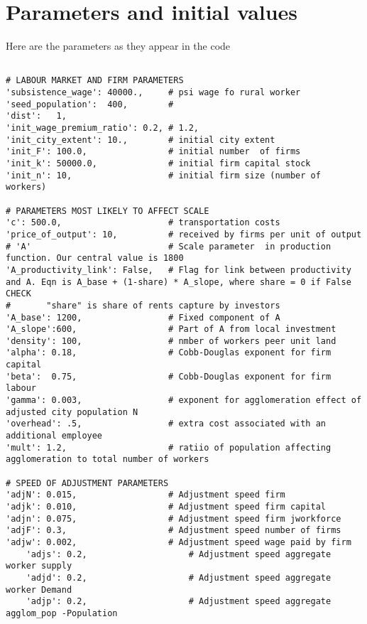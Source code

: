 \chapter{Parameters and initial values} \label{appendix-parameters}

Here are the parameters as they appear in the code 
{\tiny\begin{verbatim} 

# LABOUR MARKET AND FIRM PARAMETERS
'subsistence_wage': 40000.,     # psi wage fo rural worker
'seed_population':  400,        # 
'dist':   1, 
'init_wage_premium_ratio': 0.2, # 1.2,
'init_city_extent': 10.,        # initial city extent
'init_F': 100.0,                # initial number  of firms
'init_k': 50000.0,              # initial firm capital stock 
'init_n': 10,                   # initial firm size (number of workers)

# PARAMETERS MOST LIKELY TO AFFECT SCALE
'c': 500.0,                     # transportation costs
'price_of_output': 10,          # received by firms per unit of output
# 'A'                           # Scale parameter  in production function. Our central value is 1800
'A_productivity_link': False,   # Flag for link between productivity and A. Eqn is A_base + (1-share) * A_slope, where share = 0 if False CHECK
#       "share" is share of rents capture by investors 
'A_base': 1200,                 # Fixed component of A
'A_slope':600,                  # Part of A from local investment 
'density': 100,                 # nmber of workers peer unit land
'alpha': 0.18,                  # Cobb-Douglas exponent for firm capital
'beta':  0.75,                  # Cobb-Douglas exponent for firm labour
'gamma': 0.003,                 # exponent for agglomeration effect of adjusted city population N
'overhead': .5,                 # extra cost associated with an additional employee 
'mult': 1.2,                    # ratiio of population affecting agglomeration to total number of workers 

# SPEED OF ADJUSTMENT PARAMETERS 
'adjN': 0.015,                  # Adjustment speed firm
'adjk': 0.010,                  # Adjustment speed firm capital
'adjn': 0.075,                  # Adjustment speed firm jworkforce
'adjF': 0.3,                    # Adjustment speed number of firms
'adjw': 0.002,                  # Adjustment speed wage paid by firm
    'adjs': 0.2,                    # Adjustment speed aggregate worker supply 
    'adjd': 0.2,                    # Adjustment speed aggregate worker Demand 
    'adjp': 0.2,                    # Adjustment speed aggregate agglom_pop -Population


\end{verbatim}}
